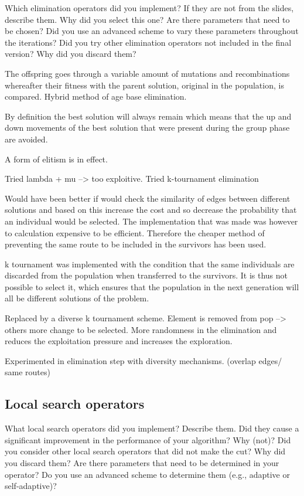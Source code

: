 \documentclass[a4paper,10pt]{article}
\newcommand{\ReplaceMe}[1]{{\color{blue}#1}}
\begin{document}
\ReplaceMe{Which elimination operators did you implement? If they are not from the slides, describe them. Why did you select this one? Are there parameters that need to be chosen? Did you use an advanced scheme to vary these parameters throughout the iterations? Did you try other elimination operators not included in the final version? Why did you discard them?} 

The offspring goes through a variable amount of mutations and recombinations whereafter their fitness with the parent solution, original in the population, is compared. Hybrid method of age base elimination.

By definition the best solution will always remain which means that the up and down movements of the best solution that were present during the group phase are avoided.  

A form of elitism  is in effect.

Tried lambda + mu --> too exploitive. 
Tried k-tournament elimination

Would have been better if would check the similarity of edges between different solutions and based on this increase the cost and so decrease the probability that an individual would be selected. The implementation that was made was however to calculation expensive to be efficient. Therefore the cheaper method of preventing the same route to be included in the survivors has been used. 

k tournament was implemented with the condition that the same individuals are discarded from the population when transferred to the survivors. It is thus not possible to select it, which ensures that the population in the next generation will all be different solutions of the problem. 

Replaced by a diverse k tournament scheme. Element is removed from 
pop --> others more change to be selected. More randomness in the elimination and reduces the exploitation pressure and increases the exploration. 

Experimented in elimination step with diversity mechanisms. (overlap edges/ same routes)

\subsection{Local search operators}

\ReplaceMe{What local search operators did you implement? Describe them. Did they cause a significant improvement in the performance of your algorithm? Why (not)? Did you consider other local search operators that did not make the cut? Why did you discard them? Are there parameters that need to be determined in your operator? Do you use an advanced scheme to determine them (e.g., adaptive or self-adaptive)?}
\end{document}
